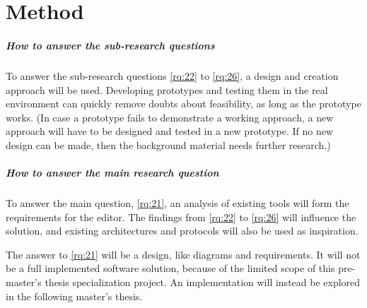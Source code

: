 \chapter{Method}

\paragraph*{How to answer the sub-research questions}
To answer the sub-research questions \cref{rq:22} to \cref{rq:26}, a design and creation approach will be used.
Developing prototypes and testing them in the real environment can quickly remove doubts about feasibility, as long as the prototype works.
(In case a prototype fails to demonstrate a working approach, a new approach will have to be designed and tested in a new prototype.
If no new design can be made, then the background material needs further research.)

\paragraph*{How to answer the main research question}
To answer the main question, \cref{rq:21}, an analysis of existing tools will form the requirements for the editor.
The findings from \cref{rq:22} to \cref{rq:26} will influence the solution, and existing architectures and protocols will also be used as inspiration.

The answer to \cref{rq:21} will be a design, like diagrams and requirements.
It will not be a full implemented software solution, because of the limited scope of this pre-master's thesis specialization project.
An implementation will instead be explored in the following master's thesis.

